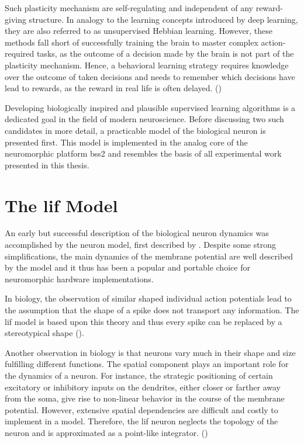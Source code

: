 Such plasticity mechanism are self-regulating and independent of any reward-giving structure. In analogy to the learning concepts introduced by deep learning, they are also referred to as unsupervised Hebbian learning. However, these methods fall short of successfully training the brain to master complex action-required tasks, as the outcome of a decision made by the brain is not part of the plasticity mechanism. Hence, a behavioral learning strategy requires knowledge over the outcome of taken decisions and needs to remember which decisions have lead to rewards, as the reward in real life is often delayed. (\citealp{gerstner2014dynamics})

Developing biologically inspired and plausible supervised learning algorithms is a dedicated goal in the field of modern neuroscience. Before discussing two such candidates in more detail, a practicable model of the biological neuron is presented first. This model is implemented in the analog core of the neuromorphic platform \gls{bss2} and resembles the basis of all experimental work presented in this thesis.

\section{The \acrlong{lif} Model}
\label{lifmodel}

An early but successful description of the biological neuron dynamics was accomplished by the  neuron model, first described by \cite{lapicque1907recherches}. Despite some strong simplifications, the main dynamics of the membrane potential are well described by the model and it thus has been a popular and portable choice for neuromorphic hardware implementations.

In biology, the observation of similar shaped individual action potentials lead to the assumption that the shape of a spike does not transport any information. The \gls{lif} model is based upon this theory and thus every spike can be replaced by a stereotypical shape (\citealp{gerstner2014dynamics}). 

Another observation in biology is that neurons vary much in their shape and size fulfilling different functions. The spatial component plays an important role for the dynamics of a neuron. For instance, the strategic positioning of certain excitatory or inhibitory inputs on the dendrites, either closer or farther away from the soma, give rise to non-linear behavior in the course of the membrane potential. However, extensive spatial dependencies are difficult and costly to implement in a model. Therefore, the \gls{lif} neuron neglects the topology of the neuron and is approximated as a point-like integrator. (\citealp{gerstner2014dynamics})

